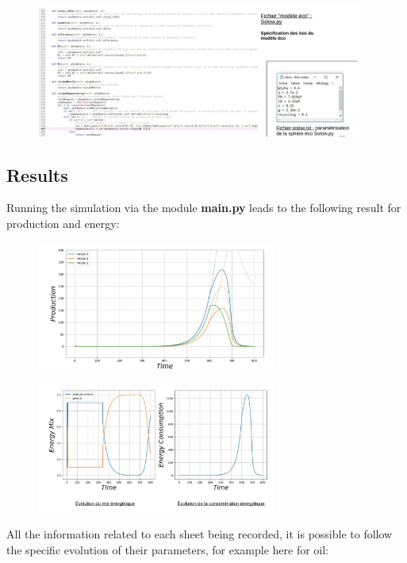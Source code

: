 \documentclass[12pt,a4paper]{article}%
\begin{document}
\begin{figure}[h]
\centering\includegraphics[width=0.95\textwidth]{figures/Parametrisation3.jpg}
\end{figure}

\subsection{Results}

Running the simulation via the module \textbf{main.py} leads to the following result for production and energy:

\begin{figure}[h]
\centering\includegraphics[width=0.7\textwidth]{figures/ResultatSimul.jpg}
\end{figure}

\begin{figure}[h]
\centering\includegraphics[width=0.7\textwidth]{figures/ResultatSimulE.jpg}
\end{figure}

All the information related to each sheet being recorded, it is possible to follow the specific evolution of their parameters, for example here for oil:
\end{document}
